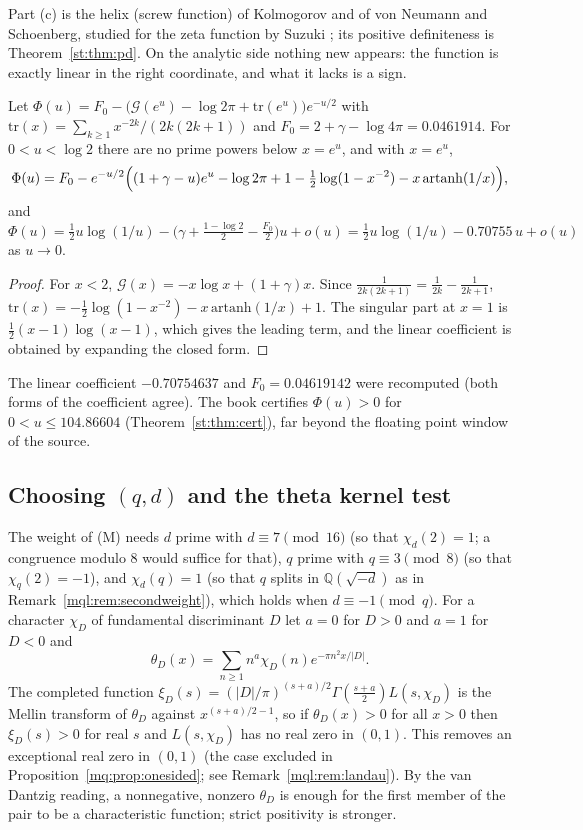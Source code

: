 Part (c) is the helix (screw function) of Kolmogorov and of von Neumann and Schoenberg, studied for the zeta function by Suzuki \cite{Suzuki22}; its positive definiteness is Theorem~\ref{st:thm:pd}. On the analytic side nothing new appears: the function is exactly linear in the right coordinate, and what it lacks is a sign.

\begin{proposition}\label{mql:prop:helixprime}
Let $\Phi(u)=F_0-\big(\mathcal G(e^u)-\log2\pi+\mathrm{tr}(e^u)\big)e^{-u/2}$ with $\mathrm{tr}(x)=\sum_{k\ge1}x^{-2k}/(2k(2k+1))$ and $F_0=2+\gamma-\log4\pi=0.0461914$. For $0<u<\log2$ there are no prime powers below $x=e^u$, and with $x=e^u$,
\[
\Phi(u)=F_0-e^{-u/2}\Bigl((1+\gamma-u)e^u-\log2\pi+1-\tfrac12\log(1-x^{-2})-x\,\mathrm{artanh}(1/x)\Bigr),
\]
and $\Phi(u)=\frac12u\log(1/u)-\big(\gamma+\frac{1-\log2}2-\frac{F_0}2\big)u+o(u)=\frac12u\log(1/u)-0.70755\,u+o(u)$ as $u\to0$.
\end{proposition}

\begin{proof}
For $x<2$, $\mathcal G(x)=-x\log x+(1+\gamma)x$. Since $\frac1{2k(2k+1)}=\frac1{2k}-\frac1{2k+1}$, $\mathrm{tr}(x)=-\frac12\log(1-x^{-2})-x\,\mathrm{artanh}(1/x)+1$. The singular part at $x=1$ is $\frac12(x-1)\log(x-1)$, which gives the leading term, and the linear coefficient is obtained by expanding the closed form.
\end{proof}

The linear coefficient $-0.70754637$ and $F_0=0.04619142$ were recomputed (both forms of the coefficient agree). The book certifies $\Phi(u)>0$ for $0<u\le104.86604$ (Theorem~\ref{st:thm:cert}), far beyond the floating point window of the source.

\subsection{Choosing $(q,d)$ and the theta kernel test}\label{mql:sub:choice}

The weight of (M) needs $d$ prime with $d\equiv7\pmod{16}$ (so that $\chi_d(2)=1$; a congruence modulo $8$ would suffice for that), $q$ prime with $q\equiv3\pmod8$ (so that $\chi_q(2)=-1$), and $\chi_d(q)=1$ (so that $q$ splits in $\mathbb Q(\sqrt{-d})$ as in Remark~\ref{mql:rem:secondweight}), which holds when $d\equiv-1\pmod q$. For a character $\chi_D$ of fundamental discriminant $D$ let $a=0$ for $D>0$ and $a=1$ for $D<0$ and
\[
\theta_D(x)=\sum_{n\ge1}n^a\chi_D(n)e^{-\pi n^2x/|D|}.
\]
The completed function $\xi_D(s)=(|D|/\pi)^{(s+a)/2}\Gamma(\frac{s+a}2)L(s,\chi_D)$ is the Mellin transform of $\theta_D$ against $x^{(s+a)/2-1}$, so if $\theta_D(x)>0$ for all $x>0$ then $\xi_D(s)>0$ for real $s$ and $L(s,\chi_D)$ has no real zero in $(0,1)$. This removes an exceptional real zero in $(0,1)$ (the case excluded in Proposition~\ref{mq:prop:onesided}; see Remark~\ref{mql:rem:landau}). By the van Dantzig reading, a nonnegative, nonzero $\theta_D$ is enough for the first member of the pair to be a characteristic function; strict positivity is stronger.

